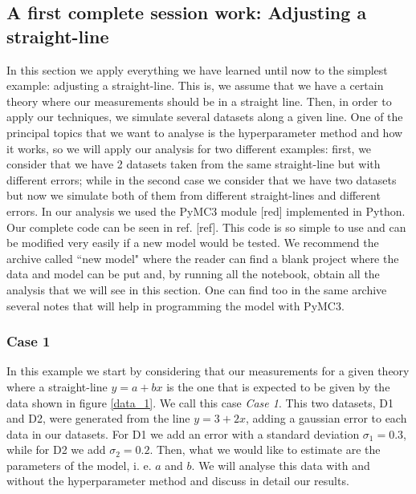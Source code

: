 \documentclass[onecolumn,           %
               showpacs,            %
               preprintnumbers,     %
               aps,                 %
               prl,          	    %
               letterpaper,             %
               superscriptaddress,      %
               nofootinbib,         %
               tightenlines,        %
               floats,floatfix      %
               ,usenatbib,
               ]{revtex4-1}
\begin{document}
 \subsection{A first complete session work: Adjusting a straight-line}

In this section we apply everything we have learned until now to the simplest example: adjusting a straight-line. This is, we assume that we have a certain theory where our measurements should be in a straight line. Then, in order to apply our techniques, we simulate several datasets along a given line. One of the principal topics that we want to analyse is the hyperparameter method and how it works, so we will apply our analysis for two different examples: first, we consider that we have 2 datasets taken from the same straight-line but with different errors; while in the second case we consider that we have two datasets but now we simulate both of them from different straight-lines and different errors. In our analysis we used the PyMC3 module [red] implemented in Python. Our complete code can be seen in ref. [ref]. This code is so simple to use and can be modified very easily if a new model would be tested. We recommend the archive called ``new model" where the reader can find a blank project where the data and model can be put and, by running all the notebook, obtain all the analysis that we will see in this section. One can find too in the same archive several notes that will help in programming the model with PyMC3. 

\subsubsection{Case 1}

In this example we start by considering that our measurements for a given theory where a straight-line $y=a+bx$ is the one that is expected to be given by the data shown in figure \ref{data_1}. We call this case \textit{Case 1}. This two datasets, D1 and D2, were generated from the line $y=3+2x$, adding a gaussian error to each data in our datasets. For D1 we add an error with a standard deviation $\sigma_1 = 0.3$, while for D2 we add $\sigma_2 = 0.2$. Then, what we would like to estimate are the parameters of the model, i. e. $a$ and $b$. We will analyse this data with and without the hyperparameter method and discuss in detail our results.
\end{document}
